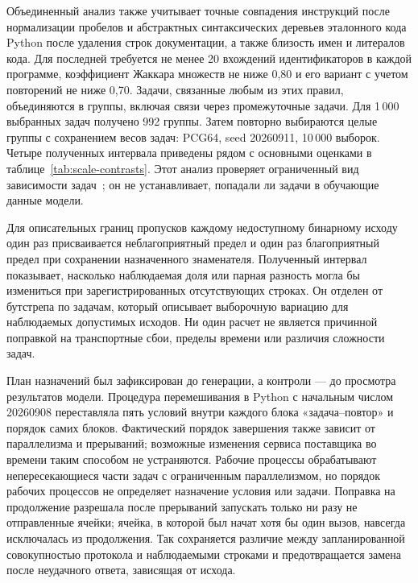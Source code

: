 Объединенный анализ также учитывает точные совпадения инструкций после нормализации пробелов и абстрактных синтаксических деревьев эталонного кода Python после удаления строк документации, а также близость имен и литералов кода. Для последней требуется не менее 20 вхождений идентификаторов в каждой программе, коэффициент Жаккара множеств не ниже 0,80 и его вариант с учетом повторений не ниже 0,70. Задачи, связанные любым из этих правил, объединяются в группы, включая связи через промежуточные задачи. Для 1\,000 выбранных задач получено 992 группы. Затем повторно выбираются целые группы с сохранением весов задач: PCG64, seed 20260911, 10\,000 выборок. Четыре полученных интервала приведены рядом с основными оценками в таблице~\ref{tab:scale-contrasts}. Этот анализ проверяет ограниченный вид зависимости задач~\cite{allamanis2019duplication,mackinnon2023clusters}; он не устанавливает, попадали ли задачи в обучающие данные модели.


Для описательных границ пропусков каждому недоступному бинарному исходу один раз присваивается неблагоприятный предел и один раз благоприятный предел при сохранении назначенного знаменателя. Полученный интервал показывает, насколько наблюдаемая доля или парная разность могла бы измениться при зарегистрированных отсутствующих строках. Он отделен от бутстрепа по задачам, который описывает выборочную вариацию для наблюдаемых допустимых исходов. Ни один расчет не является причинной поправкой на транспортные сбои, пределы времени или различия сложности задач.

План назначений был зафиксирован до генерации, а контроли --- до просмотра результатов модели. Процедура перемешивания в Python с начальным числом 20260908 переставляла пять условий внутри каждого блока «задача--повтор» и порядок самих блоков. Фактический порядок завершения также зависит от параллелизма и прерываний; возможные изменения сервиса поставщика во времени таким способом не устраняются. Рабочие процессы обрабатывают непересекающиеся части задач с ограниченным параллелизмом, но порядок рабочих процессов не определяет назначение условия или задачи. Поправка на продолжение разрешала после прерываний запускать только ни разу не отправленные ячейки; ячейка, в которой был начат хотя бы один вызов, навсегда исключалась из продолжения. Так сохраняется различие между запланированной совокупностью протокола и наблюдаемыми строками и предотвращается замена после неудачного ответа, зависящая от исхода.

